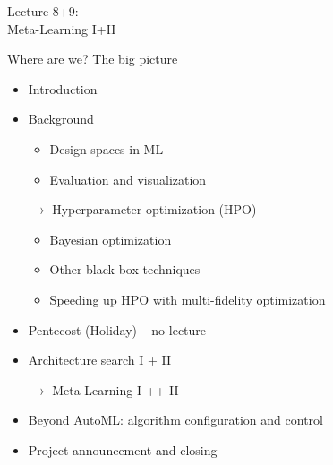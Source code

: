 \begin{frame}[c]{}

\centering
\huge
Lecture 8+9:\\
Meta-Learning I+II
\end{frame}
\begin{frame}[c]{Where are we? The big picture}

\begin{itemize}
	\item Introduction
	\item Background
	\begin{itemize}
		\item Design spaces in ML
		\item Evaluation and visualization
	\end{itemize}
	\item[$\to$] Hyperparameter optimization (HPO)
	\begin{itemize}
		\item Bayesian optimization
		\item Other black-box techniques
		\item Speeding up HPO with multi-fidelity optimization
	\end{itemize}
	\item Pentecost (Holiday) -- no lecture
	\item Architecture search I + II
	\item[$\to$] Meta-Learning I ++ II
	\item Beyond AutoML: algorithm configuration and control
	\item Project announcement and closing
\end{itemize}

\end{frame}

